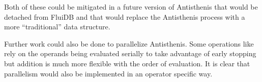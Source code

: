Both of these could be mitigated in a future version of Antisthenis
that would be detached from FluiDB and that would replace the
Antisthenis process with a more ``traditional'' data structure.

Further work could also be done to parallelize Antisthenis. Some
operations like  rely on the operands being evaluated
serially to take advantage of early stopping but addition is much more
flexible with the order of evaluation. It is clear that parallelism
would also be implemented in an operator specific way.


